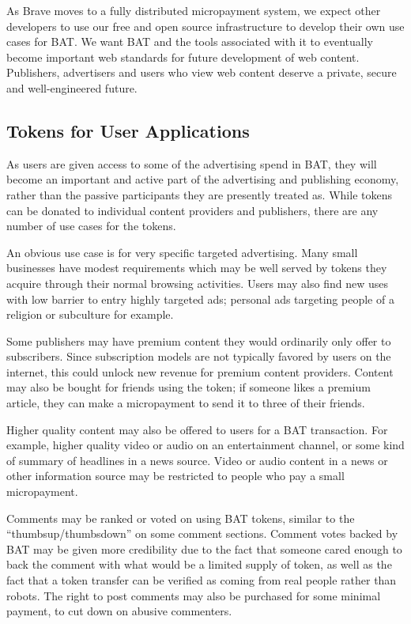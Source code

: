 \documentclass[11pt]{article}
\begin{document}
As Brave moves to a fully distributed micropayment system, we expect other developers to use our free and open source infrastructure to develop their own use cases for \textrm{BAT}. We want \textrm{BAT} and the tools associated with it to eventually become important web standards for future development of web content. Publishers, advertisers and users who view web content deserve a private, secure and well-engineered future.
\subsection{Tokens for User Applications}
\label{sec-4-4}

As users are given access to some of the advertising spend in \textrm{BAT}, they will become an important and active part of the advertising and publishing economy, rather than the passive participants they are presently treated as. While tokens can be donated to individual content providers and publishers, there are any number of use cases for the tokens.

An obvious use case is for very specific targeted advertising. Many small businesses have modest requirements which may be well served by tokens they acquire through their normal browsing activities. Users may also find new uses with low barrier to entry highly targeted ads; personal ads targeting people of a religion or subculture for example.

Some publishers may have premium content they would ordinarily only offer to subscribers. Since subscription models are not typically favored by users on the internet, this could unlock new revenue for premium content providers. Content may also be bought for friends using the token; if someone likes a premium article, they can make a micropayment to send it to three of their friends.

Higher quality content may also be offered to users for a \textrm{BAT} transaction. For example, higher quality video or audio on an entertainment channel, or some kind of summary of headlines in a news source. Video or audio content in a news or other information source may be restricted to people who pay a small micropayment.

Comments may be ranked or voted on using \textrm{BAT} tokens, similar to the ``thumbsup/thumbsdown'' on some comment sections. Comment votes backed by \textrm{BAT} may be given more credibility due to the fact that someone cared enough to back the comment with what would be a limited supply of token, as well as the fact that a token transfer can be verified as coming from real people rather than robots. The right to post comments may also be purchased for some minimal payment, to cut down on abusive commenters.
\end{document}

